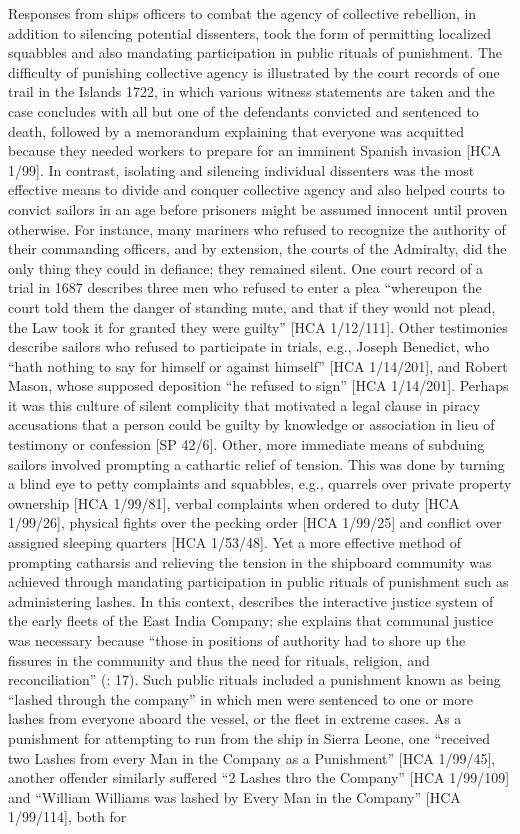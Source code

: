 Responses from ships officers to combat the agency of collective rebellion, in addition to silencing potential dissenters, took the form of permitting localized squabbles and also mandating participation in public rituals of punishment. The difficulty of punishing collective agency is illustrated by the court records of one trail in the  Islands 1722, in which various witness statements are taken and the case concludes with all but one of the defendants convicted and sentenced to death, followed by a memorandum explaining that everyone was acquitted because they needed workers to prepare for an imminent Spanish invasion [HCA 1/99]. In contrast, isolating and silencing individual dissenters was the most effective means to divide and conquer collective agency and also helped courts to convict sailors in an age before prisoners might be assumed innocent until proven otherwise. For instance, many mariners who refused to recognize the authority of their commanding officers, and by extension, the courts of the Admiralty, did the only thing they could in defiance; they remained silent. One court record of a trial in 1687 describes three men who refused to enter a plea “whereupon the court told them the danger of standing mute, and that if they would not plead, the Law took it for granted they were guilty” [HCA 1/12/111]. Other testimonies describe sailors who refused to participate in trials, e.g., Joseph Benedict, who “hath nothing to say for himself or against himself” [HCA 1/14/201], and Robert Mason, whose supposed deposition “he refused to sign” [HCA 1/14/201]. Perhaps it was this culture of silent complicity that motivated a legal clause in piracy accusations that a person could be guilty by knowledge or association in lieu of testimony or confession [SP 42/6]. Other, more immediate means of subduing sailors involved prompting a cathartic relief of tension. This was done by turning a blind eye to petty complaints and squabbles, e.g., quarrels over private property ownership [HCA 1/99/81], verbal complaints when ordered to duty [HCA 1/99/26], physical fights over the pecking order [HCA 1/99/25] and conflict over assigned sleeping quarters [HCA 1/53/48]. Yet a more effective method of prompting catharsis and relieving the tension in the shipboard community was achieved through mandating participation in public rituals of punishment such as administering lashes. In this context, \citet{Fury2015} describes the interactive justice system of the early   fleets of the East India Company; she explains that communal justice was necessary because “those in positions of authority had to shore up the fissures in the community and thus the need for rituals, religion, and reconciliation” (\citealt{Fury2015}: 17). Such public rituals included a punishment known as being “lashed through the company” in which men were sentenced to one or more lashes from everyone aboard the vessel, or the fleet in extreme cases. As a punishment for attempting to run from the ship in Sierra Leone, one  “received two Lashes from every Man in the Company as a Punishment” [HCA 1/99/45], another offender similarly suffered “2 Lashes thro the Company” [HCA 1/99/109] and “William Williams was lashed by Every Man in the Company” [HCA 1/99/114], both for 